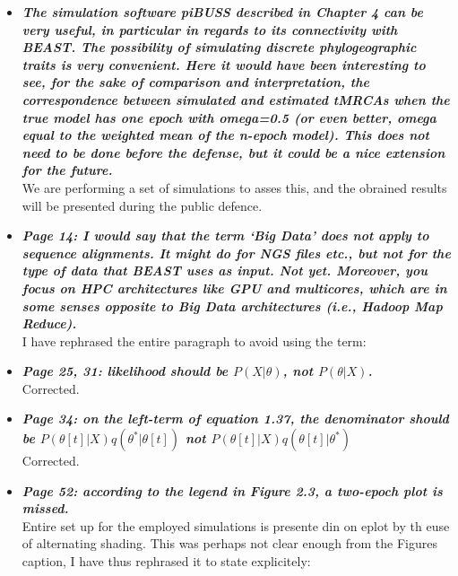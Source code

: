 \documentclass[english]{article}
\begin{document}
\begin{itemize}
\item {
{\it
\textbf{
The simulation software piBUSS described in Chapter 4 can be very useful, in particular in regards to its connectivity with BEAST. 
The possibility of simulating discrete phylogeographic traits is very convenient. 
Here it would have been interesting to see, for the sake of comparison and interpretation, the correspondence between simulated and estimated tMRCAs when the true model has one epoch with omega=0.5 (or even better, omega equal to the weighted mean of the n-epoch model). 
This does not need to be done before the defense, but it could be a nice extension for the future.
}%
}%
}%
\\
We are performing a set of simulations to asses this, and the obrained results will be presented during the public defence.


\item {
{\it
\textbf{
Page 14: I would say that the term `Big Data' does not apply to sequence alignments. 
It might do for NGS files etc., but not for the type of data that BEAST uses as input. 
Not yet. 
Moreover, you focus on HPC architectures like GPU and multicores, which are in some senses opposite to Big Data architectures (i.e., Hadoop Map Reduce).
}%
}%
}%
\\
I have rephrased the entire paragraph to avoid using the term:

\begin{quote}
\myeditDPfive
\end{quote}


\item {
{\it
\textbf{
Page 25, 31: likelihood should be $P(X| \theta)$, not $P(\theta | X)$.
}%
}%
}%
\\
Corrected.


\item {
{\it
\textbf{
Page 34: on the left-term of equation 1.37, the denominator should be
$P(\theta[t]|X) q(\theta^{*} | \theta[t])$
not 
$P(\theta[t]|X) q(\theta[t] | \theta^{*})$
}%
}%
}%
\\
Corrected.


\item {
{\it
\textbf{
Page 52: according to the legend in Figure 2.3, a two-epoch plot is missed.
}%
}%
}%
\\
Entire set up for the employed simulations is presente din on eplot by th euse of alternating shading. 
This was perhaps not clear enough from the Figures caption, I have thus rephrased it to state explicitely:


\end{itemize}
\end{document}
